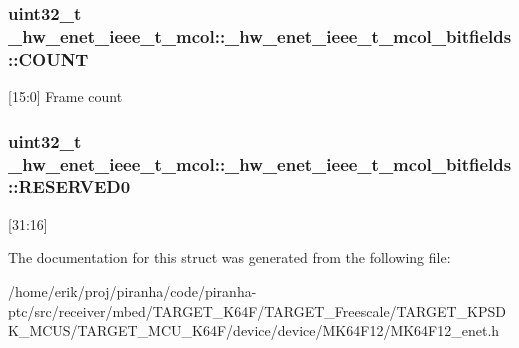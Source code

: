 \subsubsection[{\texorpdfstring{C\+O\+U\+NT}{COUNT}}]{\setlength{\rightskip}{0pt plus 5cm}uint32\+\_\+t \+\_\+hw\+\_\+enet\+\_\+ieee\+\_\+t\+\_\+mcol\+::\+\_\+hw\+\_\+enet\+\_\+ieee\+\_\+t\+\_\+mcol\+\_\+bitfields\+::\+C\+O\+U\+NT}\hypertarget{struct__hw__enet__ieee__t__mcol_1_1__hw__enet__ieee__t__mcol__bitfields_ab73b761dcd799d243b529ade5e89efbc}{}\label{struct__hw__enet__ieee__t__mcol_1_1__hw__enet__ieee__t__mcol__bitfields_ab73b761dcd799d243b529ade5e89efbc}
\mbox{[}15\+:0\mbox{]} Frame count 
\subsubsection[{\texorpdfstring{R\+E\+S\+E\+R\+V\+E\+D0}{RESERVED0}}]{\setlength{\rightskip}{0pt plus 5cm}uint32\+\_\+t \+\_\+hw\+\_\+enet\+\_\+ieee\+\_\+t\+\_\+mcol\+::\+\_\+hw\+\_\+enet\+\_\+ieee\+\_\+t\+\_\+mcol\+\_\+bitfields\+::\+R\+E\+S\+E\+R\+V\+E\+D0}\hypertarget{struct__hw__enet__ieee__t__mcol_1_1__hw__enet__ieee__t__mcol__bitfields_a7e8784b189030da1fae0f61d3cc8eb3b}{}\label{struct__hw__enet__ieee__t__mcol_1_1__hw__enet__ieee__t__mcol__bitfields_a7e8784b189030da1fae0f61d3cc8eb3b}
\mbox{[}31\+:16\mbox{]} 

The documentation for this struct was generated from the following file\+:\begin{DoxyCompactItemize}
\item 
/home/erik/proj/piranha/code/piranha-\/ptc/src/receiver/mbed/\+T\+A\+R\+G\+E\+T\+\_\+\+K64\+F/\+T\+A\+R\+G\+E\+T\+\_\+\+Freescale/\+T\+A\+R\+G\+E\+T\+\_\+\+K\+P\+S\+D\+K\+\_\+\+M\+C\+U\+S/\+T\+A\+R\+G\+E\+T\+\_\+\+M\+C\+U\+\_\+\+K64\+F/device/device/\+M\+K64\+F12/M\+K64\+F12\+\_\+enet.\+h\end{DoxyCompactItemize}
